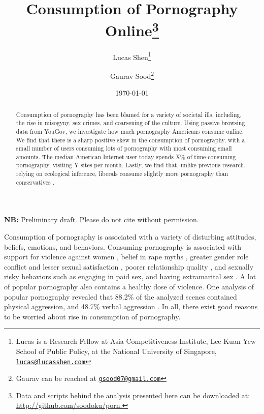 \documentclass[12pt, letterpaper]{article}
\title{\Large{Consumption of Pornography Online}\footnote{Data and scripts behind the analysis presented here can be downloaded at: \href{http://github.com/soodoku/porn}{http://github.com/soodoku/porn.}}}
\author{Lucas Shen\thanks{Lucas is a Research Fellow at Asia Competitiveness Institute, Lee Kuan Yew School of Public Policy, at the National University of Singapore, \href{mailto:lucas@lucasshen.com}{\footnotesize{\texttt{lucas@lucasshen.com}}}} \and Gaurav Sood\thanks{Gaurav can be reached at \href{mailto:gsood07@gmail.com}{\footnotesize{\texttt{gsood07@gmail.com}}}}\vspace{.5cm}}
\date{\vspace{.5cm}\normalsize{\today}}
\begin{document}
\maketitle

\begin{center}
\vspace{.5cm}\textbf{NB:} Preliminary draft. Please do not cite without permission.\vspace{1.5cm}
\end{center}

\begin{abstract}
\noindent Consumption of pornography has been blamed for a variety of societal ills, including, the rise in misogyny, sex crimes, and coarsening of the culture. Using passive browsing data from YouGov, we investigate how much pornography Americans consume online. We find that there is a sharp positive skew in the consumption of pornography, with a small number of users consuming lots of pornography with most consuming small amounts. The median American Internet user today spends X\% of time-consuming pornography, visiting Y sites per month. Lastly, we find that, unlike previous research, relying on ecological inference, liberals consume slightly more pornography than conservatives \citep{macinnis2015american, edelman2009markets}.
\end{abstract} 
\clearpage
\doublespace

Consumption of pornography is associated with a variety of disturbing attitudes, beliefs, emotions, and behaviors. Consuming pornography is associated with support for violence against women \citep{hald2010pornography, malamuth2012pornography, donnerstein1984pornography}, belief in rape myths \citep{foubert2011pornography}, greater gender role conflict and lesser sexual satisfaction \citep{szymanski2014psychological, stewart2012young}, poorer relationship quality \citep{szymanski2014psychological, szymanski2015male}, and sexually risky behaviors such as engaging in paid sex, and having extramarital sex \citep{wright2012internet}. A lot of popular pornography also contains a healthy dose of violence. One analysis of popular pornography revealed that 88.2\% of the analyzed scenes contained physical aggression, and 48.7\% verbal aggression \citep{bridges2010aggression}. In all, there exist good reasons to be worried about rise in consumption of pornography.
\end{document}
